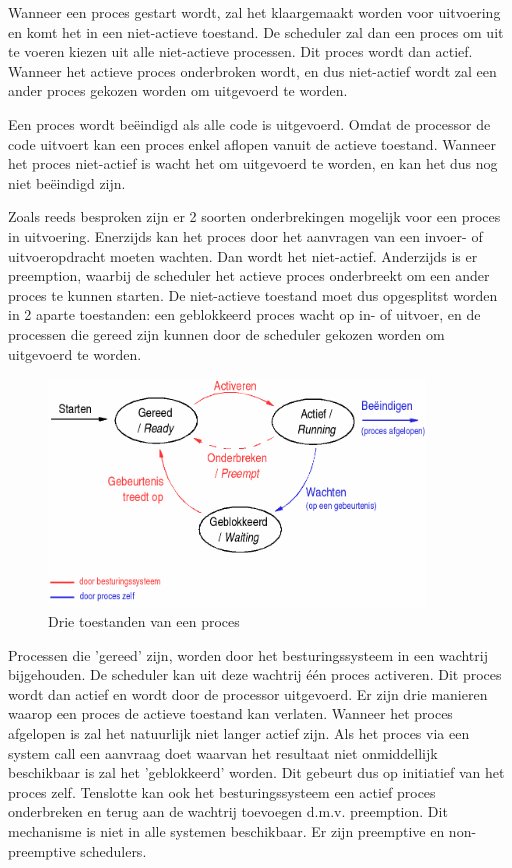 Wanneer een proces gestart wordt, zal het klaargemaakt worden
voor uitvoering en komt het in een niet-actieve toestand. De scheduler
zal dan een proces om uit te voeren kiezen uit alle niet-actieve
processen. Dit proces wordt dan actief. Wanneer het actieve proces
onderbroken wordt, en dus niet-actief wordt zal een ander proces
gekozen worden om uitgevoerd te worden.

Een proces wordt be\"eindigd als alle code is uitgevoerd. Omdat de
processor de code uitvoert kan een proces enkel aflopen vanuit de
actieve toestand. Wanneer het proces niet-actief is wacht het om
uitgevoerd te worden, en kan het dus nog niet be\"eindigd zijn.

Zoals reeds besproken zijn er 2 soorten onderbrekingen mogelijk
voor een proces in uitvoering. Enerzijds kan het proces door het
aanvragen van een invoer- of uitvoeropdracht moeten wachten. Dan wordt
het niet-actief. Anderzijds is er preemption, waarbij de scheduler het
actieve proces onderbreekt om een ander proces te kunnen starten. De
niet-actieve toestand moet dus opgesplitst worden in 2 aparte
toestanden: een geblokkeerd proces wacht op in- of uitvoer, en de
processen die gereed zijn kunnen door de scheduler gekozen worden om
uitgevoerd te worden.

\begin{figure}
\begin{center}
\includegraphics[width=100mm]{images/fig0503.png}
\caption{Drie toestanden van een proces}
\label{toestproc2}
\end{center}
\end{figure}


Processen die 'gereed' zijn, worden door het besturingssysteem
in een wachtrij bijgehouden. De scheduler kan uit deze wachtrij \'e\'en
proces activeren. Dit proces wordt dan actief en wordt door de
processor uitgevoerd. Er zijn drie manieren waarop een proces de
actieve toestand kan verlaten. Wanneer het proces afgelopen is zal het
natuurlijk niet langer actief zijn. Als het proces via een system call
een aanvraag doet waarvan het resultaat niet onmiddellijk beschikbaar
is zal het 'geblokkeerd' worden. Dit gebeurt dus op initiatief van het
proces zelf. Tenslotte kan ook het besturingssysteem een actief proces
onderbreken en terug aan de wachtrij toevoegen d.m.v. preemption. Dit
mechanisme is niet in alle systemen beschikbaar. Er zijn preemptive en
non-preemptive schedulers.

